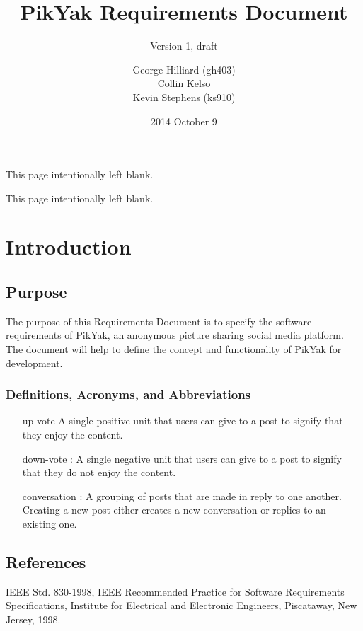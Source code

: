 \documentclass[11pt]{scrartcl}
\title{PikYak Requirements Document}
\subtitle{Version 1, draft}
\author{
    George Hilliard (gh403) \\
    Collin Kelso \\
    Kevin Stephens (ks910)
}
\date{2014 October 9}
\newcommand*{\blankpage}{%
\clearpage
\vspace*{\fill}
\centerline{This page intentionally left blank.}
\vspace{\fill}
\clearpage}
\let\stdsection\section
\renewcommand\section{\newpage\stdsection}
\begin{document}

\maketitle

\blankpage

\tableofcontents

\blankpage


\section{Introduction}
    \subsection{Purpose}
        The purpose of this Requirements Document is to specify the software requirements of PikYak, an anonymous picture sharing social media platform. The document will help to define the concept and functionality of PikYak for development.

        \subsubsection{Definitions, Acronyms, and Abbreviations}
            \begin{itemize}
                \item[up-vote] A single positive unit that users can give to a post to signify that they enjoy the content.

                \item[down-vote]: A single negative unit that users can give to a post to signify that they do not enjoy the content.

                \item[conversation]: A grouping of posts that are made in reply to one another.
                                     Creating a new post either creates a new conversation or replies to an existing one.
            \end{itemize}

    \subsection{References}
        IEEE Std. 830-1998, IEEE Recommended Practice for Software Requirements Specifications, Institute for Electrical and Electronic Engineers, Piscataway, New Jersey, 1998.
\end{document}
